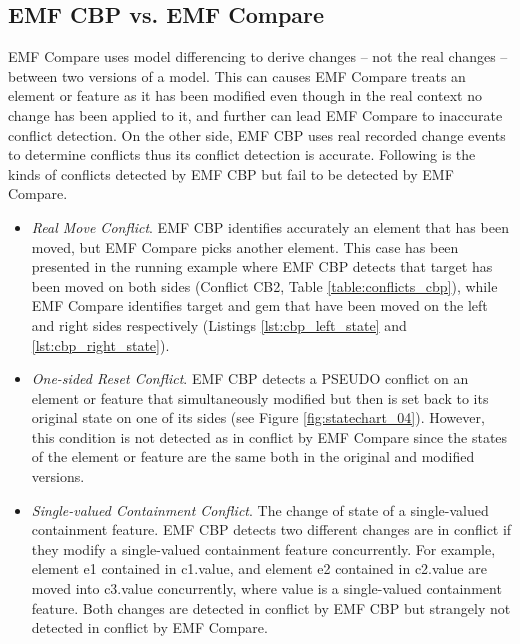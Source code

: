 \subsection{EMF CBP vs. EMF Compare}
\label{sec:emf_cbp_vs_emf_compare}
EMF Compare uses model differencing to derive changes -- not the real changes -- between two versions of a model. This can causes EMF Compare treats an element or feature as it has been modified even though in the real context no change has been applied to it, and further can lead EMF Compare to inaccurate conflict detection. On the other side, EMF CBP uses real recorded change events to determine conflicts thus its conflict detection is accurate. Following is the kinds of conflicts detected by EMF CBP but fail to be detected by EMF Compare. 
\begin{itemize}
  
  \item \emph{Real Move Conflict}. EMF CBP identifies accurately an element that has been moved, but EMF Compare picks another element. This case has been presented in the running example where EMF CBP detects that \textsf{target} has been moved on both sides (Conflict CB2, Table \ref{table:conflicts_cbp}), while EMF Compare identifies \textsf{target} and \textsf{gem} that have been moved on the left and right sides respectively (Listings \ref{lst:cbp_left_state} and \ref{lst:cbp_right_state}).
  
  \item \emph{One-sided Reset Conflict}. EMF CBP detects a \textsf{PSEUDO} conflict on an element or feature that simultaneously modified but then is set back to its original state on one of its sides (see Figure \ref{fig:statechart_04}). However, this condition is not detected as in conflict by EMF Compare since the states of the element or feature are the same both in the original and modified versions.   
 
  \item \emph{Single-valued Containment Conflict}. The change of state of a single-valued containment feature. EMF CBP detects two different changes are in conflict if they modify a single-valued containment feature concurrently. For example, element \textsf{e1} contained in \textsf{c1}.\textsf{value}, and element \textsf{e2} contained in \textsf{c2}.\textsf{value} are moved into \textsf{c3}.\textsf{value} concurrently, where \textsf{value} is a single-valued containment feature. Both changes are detected in conflict by EMF CBP but strangely not detected in conflict by EMF Compare.
\end{itemize}

